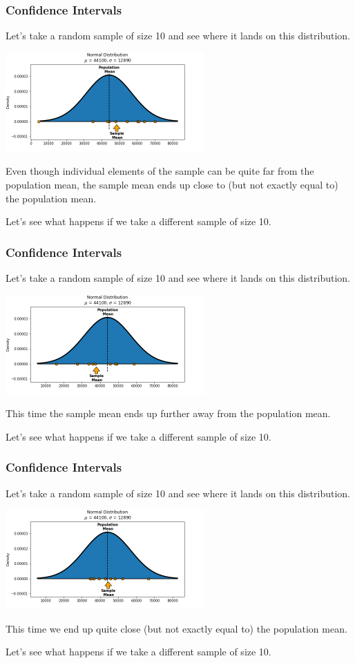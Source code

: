 \documentclass[11pt, table]{beamer}
\begin{document}
\begin{frame}
\frametitle{Confidence Intervals}
Let's take a random sample of size 10 and see where it lands on this distribution.
\begin{center}
\includegraphics[width = 3in]{images/sample_plot_1.png}
\end{center}
Even though individual elements of the sample can be quite far from the population mean, the sample mean ends up close to (but not exactly equal to) the population mean.

Let's see what happens if we take a different sample of size 10.
\end{frame}

\begin{frame}
\frametitle{Confidence Intervals}
Let's take a random sample of size 10 and see where it lands on this distribution.
\begin{center}
\includegraphics[width = 3in]{images/sample_plot_2.png}
\end{center}
This time the sample mean ends up further away from the population mean.

Let's see what happens if we take a different sample of size 10.
\end{frame}

\begin{frame}
\frametitle{Confidence Intervals}
Let's take a random sample of size 10 and see where it lands on this distribution.
\begin{center}
\includegraphics[width = 3in]{images/sample_plot_3.png}
\end{center}
This time we end up quite close (but not exactly equal to) the population mean.

Let's see what happens if we take a different sample of size 10.
\end{frame}
\end{document}
